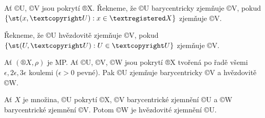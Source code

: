 \documentclass[12pt]{article}                   %
\begin{document}
    \begin{definice}
        Ať ©U, ©V jsou pokrytí ®X. Řekneme, že ©U barycentricky zjemňuje ©V, pokud $\{\st(x, ©U): x \in ®X\}$ zjemňuje ©V.

        Řekneme, že ©U hvězdovitě zjemňuje ©V, pokud $\{\st(U, ©U): U \in ©U\}$ zjemňuje ©V.
    \end{definice}

    \begin{priklady}
            Ať $(®X, \rho)$ je MP. Ať ©U, ©V, ©W jsou pokrytí ®X tvořená po řadě všemi $\epsilon, 2\epsilon, 3\epsilon$ koulemi ($\epsilon > 0$ pevné). Pak ©U zjemňuje barycentricky ©V a hvězdovitě ©W.
    \end{priklady}

    \begin{lemma}
        Ať $X$ je množina, ©U pokrytí ©X, ©V barycentrické zjemnění ©U a ©W barycentrické zjemnění ©V. Potom ©W je hvězdovité zjemnění ©U.
    \end{lemma}
\end{document}
